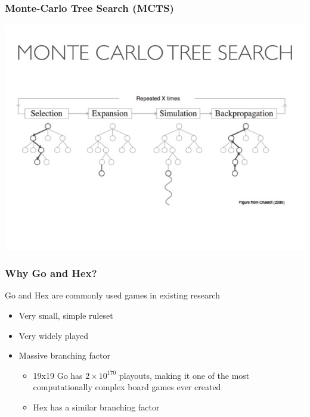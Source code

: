 \documentclass{beamer}
\begin{document}
\begin{frame}
\frametitle{Monte-Carlo Tree Search (MCTS)}
\vspace{-0.75in}
\begin{center}
\includegraphics[clip, trim={0 4cm 0 5cm}, scale=.5]{images/mcts.jpg}
\end{center}
\end{frame}

\begin{frame}
\frametitle{Why Go and Hex?}
Go and Hex are commonly used games in existing research
\begin{itemize}
 \item Very small, simple ruleset
 \item Very widely played
 \item Massive branching factor
\begin{itemize}
 \item 19x19 Go has $2 \times 10^{170}$ playouts, making it one of the most computationally complex board games ever created
 \item Hex has a similar branching factor
\end{itemize}
\end{itemize}
\end{frame}
\end{document}
